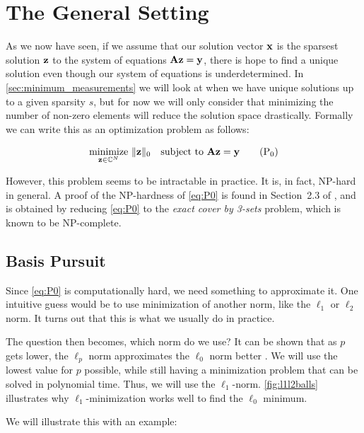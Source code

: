 \section{The General Setting}
As we now have seen, if we assume that our solution vector $ \mathbf{x} $ is the sparsest solution $ \mathbf{z} $ to the system of equations $ \mathbf{A}\mathbf{z} = \mathbf{y} $, there is hope to find a unique solution even though our system of equations is underdetermined. In \cref{sec:minimum_measurements} we will look at when we have unique solutions up to a given sparsity $ s $, but for now we will only consider that minimizing the number of non-zero elements will reduce the solution space drastically. Formally we can write this as an optimization problem as follows:

\begin{equation}
	\underset{\mathbf{z} \in \mathbb{C}^{N}}{\text{minimize}}~ \lVert\mathbf{z}\rVert_0
	\quad\text{subject to}~ \mathbf{A}\mathbf{z} = \mathbf{y}
	\tag{P$_0$}
	\label{eq:P0}
\end{equation}

\noindent However, this problem seems to be intractable in practice. It is, in fact, NP-hard in general. A proof of the NP-hardness of \eqref{eq:P0} is found in Section~2.3 of \cite{foucart13intro}, and is obtained by reducing \eqref{eq:P0} to the \textit{exact cover by 3-sets} problem, which is known to be NP-complete.





\subsection{Basis Pursuit}
Since \eqref{eq:P0} is computationally hard, we need something to approximate it. One intuitive guess would be to use minimization of another norm, like the $ \ell_{1} $ or $ \ell_{2} $ norm. It turns out that this is what we usually do in practice. 

The question then becomes, which norm do we use? It can be shown that  as $ p $ gets lower, the $ \ell_{p} $ norm approximates the $ \ell_{0} $ norm better \cite[Section 4.1]{foucart13intro}. We will use the lowest value for $ p $ possible, while still having a minimization problem that can be solved in polynomial time. Thus, we will use the $ \ell_{1} $-norm. \cref{fig:l1l2balls} illustrates why $ \ell_{1} $-minimization works well to find the $ \ell_{0} $ minimum. 


We will illustrate this with an example:

